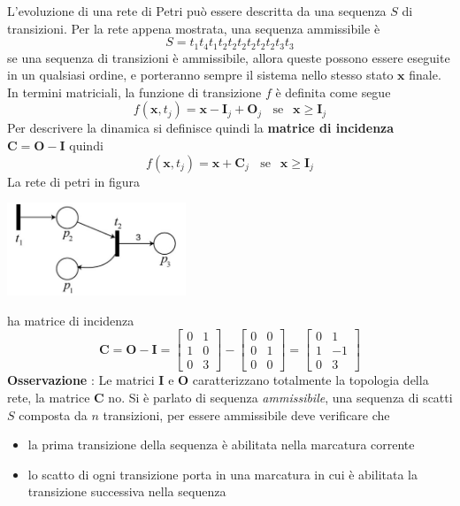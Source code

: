 \documentclass[10pt, letterpaper]{report}
\begin{document}
L'evoluzione di una rete di Petri può essere descritta da una sequenza $S$ di transizioni. Per la rete appena mostrata, una sequenza ammissibile è 
$$ S=t_1t_4t_1t_2t_2t_2t_2t_2t_2t_3t_3$$
\prop{} se una sequenza di transizioni è ammissibile, allora queste possono essere eseguite in un qualsiasi ordine, e porteranno sempre il sistema nello stesso stato $\mathbf x$ finale.\acc 
In termini matriciali, la funzione di transizione $f$ è definita come segue 
$$ f(\mathbf x,t_j)=\mathbf x -\mathbf I_j + \mathbf O_j \ \ \ \ \text{se }  \ \ \mathbf x\ge \mathbf I_j$$
Per descrivere la dinamica si definisce quindi la \textbf{matrice di incidenza} $\mathbf C = \mathbf O - \mathbf I$ 
quindi 
$$ f(\mathbf x,t_j)=\mathbf x +\mathbf C_j\ \ \ \ \text{se } \ \ \mathbf x\ge \mathbf I_j$$
La rete di petri in figura \begin{center}
    \includegraphics[width=0.4\textwidth]{images/petri4.png}
\end{center}
ha matrice di incidenza $$ \mathbf C = \mathbf O - \mathbf I = \begin{bmatrix}
    0 & 1 \\ 1 & 0 \\ 0 & 3
\end{bmatrix}-\begin{bmatrix}
    0 & 0 \\ 0 & 1 \\ 0 & 0 
\end{bmatrix}=\begin{bmatrix}
    0 & 1 \\ 1 & -1 \\ 0 & 3
\end{bmatrix}$$
\textbf{Osservazione} : Le matrici $\mathbf I$ e $\mathbf O$ caratterizzano totalmente la topologia della rete, la matrice $\mathbf C$ no.\acc 
Si è parlato di sequenza \textit{ammissibile}, una sequenza di scatti $S$ composta da $n$ transizioni, per essere ammissibile deve verificare che \begin{itemize}
    \item la prima transizione della sequenza è abilitata nella marcatura corrente
    \item lo scatto di ogni transizione porta in una marcatura in cui è abilitata la transizione
    successiva nella sequenza
\end{itemize}
\end{document}
